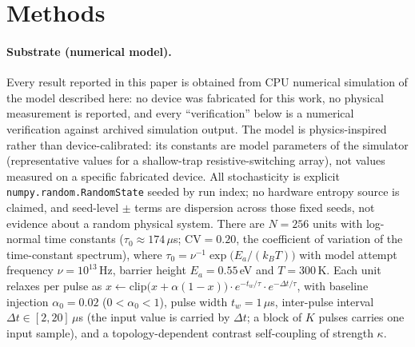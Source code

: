\documentclass[preprint,12pt]{elsarticle}
\begin{document}
\section{Methods}
\label{sec:methods}

\paragraph{Substrate (numerical model).} Every result reported in this paper
is obtained from CPU numerical simulation of the model described here: no
device was fabricated for this work, no physical measurement is reported, and
every ``verification'' below is a numerical verification against archived
simulation output. The model is physics-inspired rather than device-calibrated:
its constants are model parameters of the simulator (representative
values for a shallow-trap resistive-switching array), not values measured on
a specific fabricated device. All stochasticity is explicit
\texttt{numpy.random.RandomState} seeded by run index; no hardware entropy
source is claimed, and seed-level $\pm$ terms are dispersion across those
fixed seeds, not evidence about a random physical system. There are $N=256$ units with log-normal time
constants ($\tau_0\approx174\,\mu$s; CV$=0.20$, the coefficient of variation
of the time-constant spectrum), where
$\tau_0=\nu^{-1}\exp\!\big(E_a/(k_BT)\big)$ with model attempt frequency
$\nu=10^{13}\,$Hz, barrier height $E_a=0.55\,$eV and $T=300\,$K. Each unit
relaxes per pulse as
$x \leftarrow \mathrm{clip}\big(x+\alpha(1-x)\big)\cdot e^{-t_w/\tau}
\cdot e^{-\Delta t/\tau}$, with baseline injection $\alpha_0=0.02$
($0<\alpha_0<1$), pulse width $t_w=1\,\mu$s, inter-pulse interval
$\Delta t\in[2,20]\,\mu$s (the input value is carried by $\Delta t$; a block
of $K$ pulses carries one input sample), and a topology-dependent contrast
self-coupling of strength $\kappa$.
\end{document}
